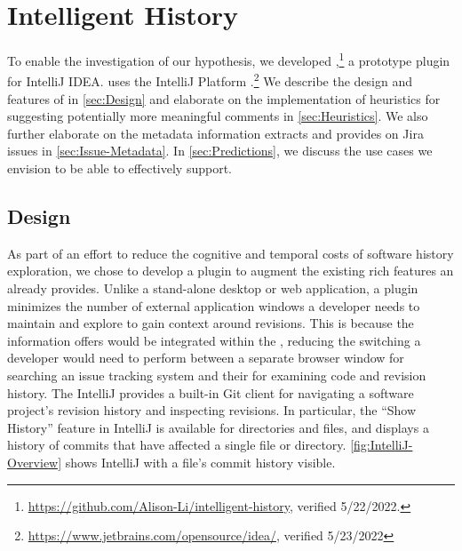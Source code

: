 \chapter{Intelligent History}
\label{ch:Intelligent-History}

To enable the investigation of our hypothesis, we developed ,\footnote{\url{https://github.com/Alison-Li/intelligent-history}, verified 5/22/2022.} a prototype plugin for IntelliJ IDEA.
 uses the IntelliJ Platform .\footnote{\url{https://www.jetbrains.com/opensource/idea/}, verified 5/23/2022}
We describe the design and features of  in \autoref{sec:Design} and elaborate on the implementation of heuristics
for suggesting potentially more meaningful comments in \autoref{sec:Heuristics}.
We also further elaborate on the metadata information  extracts and provides on Jira issues in \autoref{sec:Issue-Metadata}. 
In \autoref{sec:Predictions}, we discuss the use cases we envision  to be able to effectively support.

\section{Design}
\label{sec:Design}

As part of an effort to reduce the cognitive and temporal costs of software history exploration, we chose to develop a plugin to augment the existing rich features an  already provides.
Unlike a stand-alone desktop or web application, a plugin minimizes the number of external application windows a developer needs to maintain and explore to gain context around revisions. 
This is because the information  offers would be integrated within the , reducing the switching a developer would need to perform between a separate browser window for searching an issue tracking system and their  for examining code and revision history.
The IntelliJ  provides a built-in Git client  for navigating a software project's revision history and inspecting revisions. 
In particular, the ``Show History'' feature in IntelliJ is available for directories and files, and displays a history of commits that have affected a single file or directory.
\autoref{fig:IntelliJ-Overview} shows IntelliJ with a file's commit history visible.

